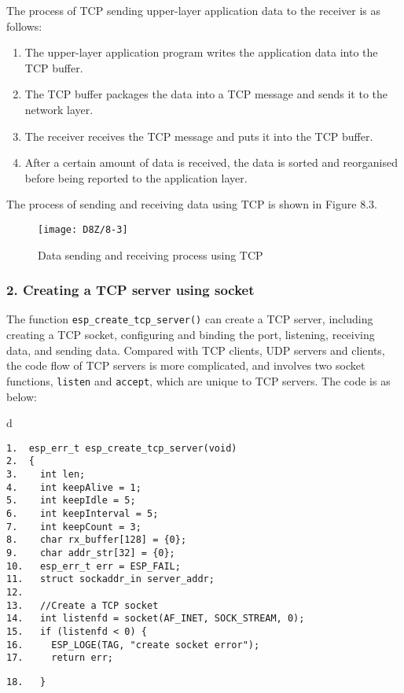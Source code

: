 \documentclass[a4paper,12pt]{book}
\begin{document}
The process of TCP sending upper-layer application data to the receiver is as follows:

\begin{enumerate}[label=(\arabic*)]
    \item The upper-layer application program writes the application data into the TCP buffer.
    \item The TCP buffer packages the data into a TCP message and sends it to the network layer.
    \item The receiver receives the TCP message and puts it into the TCP buffer.
    \item After a certain amount of data is received, the data is sorted and reorganised before being reported to the application layer.
\end{enumerate}

The process of sending and receiving data using TCP is shown in Figure 8.3.

\begin{figure}[!h]
    \centering
    \texttt{[image: D8Z/8-3]}
    \caption{Data sending and receiving process using TCP}
\end{figure}

\subsubsection{2. Creating a TCP server using socket}

The function \verb|esp_create_tcp_server()| can create a TCP server, including creating a TCP socket, configuring and binding the port, listening, receiving data, and sending data. Compared with TCP clients, UDP servers and clients, the code flow of TCP servers is more complicated, and involves two socket functions, \verb|listen| and \verb|accept|, which are unique to TCP servers. The code is as below:

\begin{codebloc}
\begin{tabular}{d}
\vspace{2pt}
\begin{verbatim}
1.  esp_err_t esp_create_tcp_server(void)
2.  {
3.    int len;
4.    int keepAlive = 1;
5.    int keepIdle = 5;
6.    int keepInterval = 5;
7.    int keepCount = 3;
8.    char rx_buffer[128] = {0};
9.    char addr_str[32] = {0};
10.   esp_err_t err = ESP_FAIL;
11.   struct sockaddr_in server_addr;
12.	
13.   //Create a TCP socket
14.   int listenfd = socket(AF_INET, SOCK_STREAM, 0);
15.   if (listenfd < 0) {
16.     ESP_LOGE(TAG, "create socket error");
17.     return err;
\end{verbatim}
\verb|18.   }|
\end{tabular}
\end{codebloc}
\end{document}
